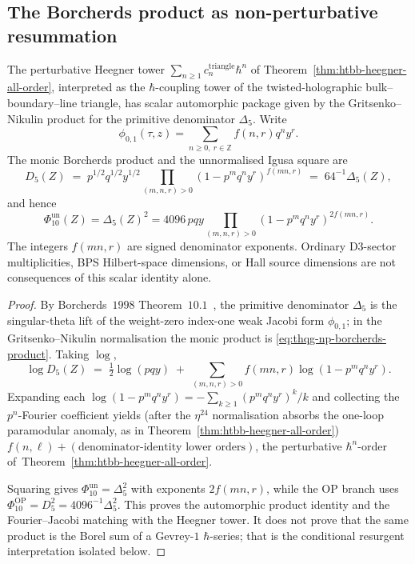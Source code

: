 \subsection{The Borcherds product as non-perturbative resummation}
\label{subsec:thqg-np-borcherds-resummation}

\begin{theorem}
\label{thm:thqg-np-borcherds-resummation}
The perturbative Heegner tower $\sum_{n\geq 1}c_n^{\mathrm{triangle}}\hbar^n$
of Theorem~\ref{thm:htbb-heegner-all-order}, interpreted as the
$\hbar$-coupling tower of the twisted-holographic bulk--boundary--line
triangle, has scalar automorphic package given by the
Gritsenko--Nikulin product for the primitive denominator $\Delta_5$.
Write
\[
 \phi_{0,1}(\tau,z)=\sum_{n\geq 0,\ r\in\mathbb Z} f(n,r)q^n y^r.
\]
The monic Borcherds product and the unnormalised Igusa square are
\begin{equation}\label{eq:thqg-np-borcherds-product}
 D_5(Z)
 \;=\;
 p^{1/2}q^{1/2}y^{1/2}
 \prod_{(m, n, r)>0}\!(1 - p^m q^n y^r)^{f(mn,r)}
 \;=\;64^{-1}\Delta_5(Z),
\end{equation}
and hence
\[
 \Phi_{10}^{\mathrm{un}}(Z)
 =\Delta_5(Z)^2
 =4096\,p q y
 \prod_{(m,n,r)>0}(1-p^m q^n y^r)^{2f(mn,r)}.
\]
The integers $f(mn,r)$ are signed denominator exponents.  Ordinary
D$3$-sector multiplicities, BPS Hilbert-space dimensions, or Hall
source dimensions are not consequences of this scalar identity alone.
\end{theorem}

\begin{proof}
By Borcherds~$1998$ Theorem~$10.1$~\cite[Thm.~10.1]{Borcherds1998},
the primitive denominator $\Delta_5$ is the singular-theta lift of the
weight-zero index-one weak Jacobi form $\phi_{0,1}$; in the
Gritsenko--Nikulin normalisation the monic product is
\eqref{eq:thqg-np-borcherds-product}. Taking $\log$,
\[
 \log D_5(Z) \;=\; \tfrac12\log(pqy)
 \;+\; \sum_{(m, n, r)>0}f(mn,r)\log(1 - p^m q^n y^r).
\]
Expanding each $\log(1 - p^m q^n y^r) = -\sum_{k\geq 1}(p^m q^n y^r)^k/k$
and collecting the $p^n$-Fourier coefficient yields (after the
$\eta^{24}$ normalisation absorbs the one-loop paramodular anomaly,
as in Theorem~\ref{thm:htbb-heegner-all-order})
$f(n,\ell) + (\text{denominator-identity lower orders})$, the
perturbative $\hbar^n$-order
of~Theorem~\ref{thm:htbb-heegner-all-order}.

Squaring gives $\Phi_{10}^{\mathrm{un}}=\Delta_5^2$ with exponents
$2f(mn,r)$, while the OP branch uses
$\Phi_{10}^{\mathrm{OP}}=D_5^2=4096^{-1}\Delta_5^2$.  This proves the
automorphic product identity and the Fourier--Jacobi matching with the
Heegner tower. It does not prove that the same product is the Borel sum
of a Gevrey-$1$ $\hbar$-series; that is the conditional resurgent
interpretation isolated below.
\end{proof}

